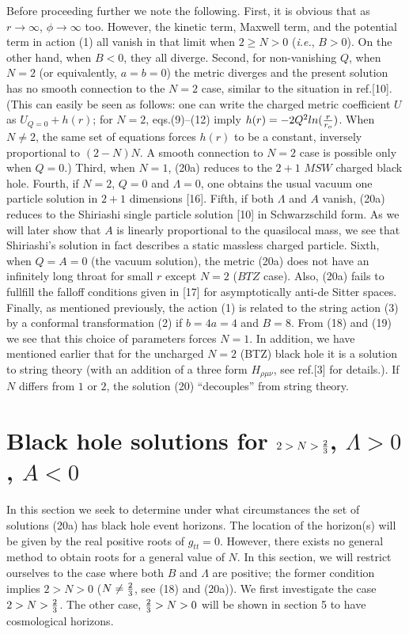 \documentclass[12pt]{article}
\begin{document}
Before proceeding further we note the following.
First, it is obvious that as $r\rightarrow\infty$,
$\phi\rightarrow\infty$ too. However, the kinetic term,
Maxwell term, and the potential term in action (1)
all vanish in that limit when $2\geq N>0$ ({\sl i.e.}, $B>0$).
On the other hand, when $B<0$, they all diverge. Second, for
non-vanishing $Q$, when $N=2$ (or equivalently, $a=b=0$)
the metric diverges and the
present solution has no smooth connection to the $N=2$ case, similar to the
situation in ref.[10]. (This can easily be seen as follows: one can
write the charged metric coefficient $U$ as $U_{Q=0}+h(r)$; for $N=2$,
eqs.(9)--(12) imply $h(r)=-2Q^2ln({r\over r_o})$. When $N\ne 2$, the same
set of equations forces $h(r)$ to be a constant, inversely proportional to
$(2-N)N$. A smooth connection to $N=2$ case is possible only when $Q=0$.)
Third, when $N=1$, (20a) reduces to the $2+1$ $MSW$ charged black hole.
Fourth, if $N=2$, $Q=0$ and $\Lambda=0$, one obtains the usual vacuum one
particle solution in $2+1$ dimensions [16]. Fifth, if both $\Lambda$ and
$A$ vanish, (20a) reduces to the Shiriashi single particle solution [10] in
Schwarzschild form. As we will later show that $A$ is linearly proportional
to the quasilocal mass, we see that Shiriashi's solution in fact describes
a static massless charged particle. Sixth, when $Q=A=0$ (the vacuum
solution), the metric (20a) does not have an infinitely long throat for small
$r$ except $N=2$ ($BTZ$ case). Also, (20a) fails to fullfill the falloff
conditions given in [17] for asymptotically anti-de Sitter spaces. Finally,
as mentioned previously, the action (1) is related to the string action (3)
by a conformal transformation (2) if $b=4a=4$ and $B=8$. From (18) and (19)
we see that this choice of parameters forces $N=1$. In addition,
we have mentioned earlier that for the uncharged $N=2$ (BTZ) black hole
it is a solution to string theory
(with an addition of a three form $H_{{\rho}{\mu}{\nu}}$,
see ref.[3] for details.). If $N$ differs from $1$ or $2$,
the solution (20) ``decouples'' from string theory.


\section{Black hole solutions for $2>N>{2\over 3}$, $\Lambda>0$,
		 $A<0$}

In this section we seek to determine under what circumstances the set of
solutions (20a) has black hole event horizons. The location of the
horizon(s) will be given by the real positive roots of $g_{tt}=0$.  However,
there exists no general method to obtain roots for a general value of $N$.
In this section, we will restrict ourselves to the case where both $B$ and
$\Lambda$ are positive; the former condition implies $2>N>0$ ($N\ne{2\over
3}$, see (18) and (20a)). We first investigate the case $2>N>{2\over3}$.
The other case, ${2\over 3}>N>0$ will be shown in section 5 to have
cosmological horizons.
\end{document}
